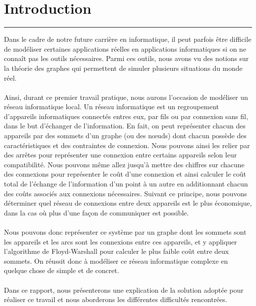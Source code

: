 \documentclass[10pt,letterpaper]{article}
\begin{document}
\section{Introduction}
\hrule
\vspace{1em}
Dans le cadre de notre future carrière en informatique, il peut parfois être difficile de modéliser 
certaines applications réelles en applications informatiques si on ne connaît pas les outils nécessaires. 
Parmi ces outils, nous avons vu des notions sur la théorie des graphes qui permettent de simuler plusieurs situations du monde réel.\\
\\
Ainsi, durant ce premier travail pratique, nous aurons l’occasion de modéliser un réseau informatique local. 
Un réseau informatique est un regroupement d’appareils informatiques connectés entres eux, 
par fils ou par connexion sans fil, dans le but d’échanger de l’information. 
En fait, on peut représenter chacun des appareils par des sommets d’un graphe (ou des nœuds) dont chacun possède des caractéristiques et des contraintes de connexion. 
Nous pouvons ainsi les relier par des arrêtes pour représenter une connexion entre certains appareils selon leur compatibilité. 
Nous pouvons même allez jusqu’à mettre des chiffres sur chacune des connexions pour représenter le coût d’une connexion 
et ainsi calculer le coût total de l’échange de l’information d’un point à un autre en additionnant chacun des coûts associés aux connexions nécessaires. 
Suivant ce principe, nous pouvons déterminer quel réseau de connexions entre deux appareils est le plus économique, 
dans la cas où plus d’une façon de communiquer est possible.\\
\\
Nous pouvons donc représenter ce système par un graphe dont les sommets sont les appareils et les arcs sont les connexions entre ces appareils, 
et y appliquer l’algorithme de Floyd-Warshall pour calculer le plus faible coût entre deux sommets. 
On réussit donc à modéliser ce réseau informatique complexe en quelque chose de simple et de concret.\\
\\
Dans ce rapport, nous présenterons une explication de la solution adoptée pour réaliser ce travail et nous aborderons les différentes difficultés rencontrées.



\newpage
\end{document}
